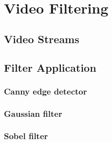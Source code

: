 \chapter{Video Filtering}
\section{Video Streams}

\section{Filter Application}
\label{sec:filterapp}


\subsection{Canny edge detector}
\label{subsec:canny}


\subsection{Gaussian filter}
\label{subsec:gauss}


\subsection{Sobel filter}
\label{subsec:sobel}

